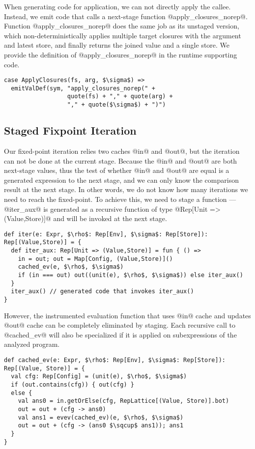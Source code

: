 When generating code for application, we can not directly apply the callee.
Instead, we emit code that calls a next-stage function @apply_closures_norep@.
Function @apply_closures_norep@ does the same job as its unstaged version,
which non-deterministically applies multiple target closures with the argument
and latest store, and finally returns the joined value and a single store.
We provide the definition of @apply_closures_norep@ in the runtime supporting code.

\begin{lstlisting}
case ApplyClosures(fs, arg, $\sigma$) =>
  emitValDef(sym, "apply_closures_norep(" + 
                  quote(fs) + "," + quote(arg) + 
                  "," + quote($\sigma$) + ")")
\end{lstlisting}

\subsection{Staged Fixpoint Iteration} 

Our fixed-point iteration relies two caches @in@ and @out@, but the iteration 
can not be done at the current stage.
Because the @in@ and @out@ are both next-stage values, thus the test of whether 
@in@ and @out@ are equal is a generated expression to the next stage, and we can only 
know the comparison result at the next stage. 
In other words, we do not know how many iterations we need to reach the fixed-point.
To achieve this, we need to stage a
function --- @iter_aux@ is generated as a recursive function of type @Rep[Unit => (Value,Store)]@
and will be invoked at the next stage.

\begin{lstlisting}
def iter(e: Expr, $\rho$: Rep[Env], $\sigma$: Rep[Store]): 
Rep[(Value,Store)] = {
  def iter_aux: Rep[Unit => (Value,Store)] = fun { () =>
    in = out; out = Map[Config, (Value,Store)]()
    cached_ev(e, $\rho$, $\sigma$)
    if (in === out) out((unit(e), $\rho$, $\sigma$)) else iter_aux()
  }
  iter_aux() // generated code that invokes iter_aux()
}
\end{lstlisting}

However, the instrumented evaluation function that uses @in@ cache and updates @out@ cache
can be completely eliminated by staging. Each recursive call to @cached_ev@ will also be specialized
if it is applied on subexpressions of the analyzed program.

\begin{lstlisting}
def cached_ev(e: Expr, $\rho$: Rep[Env], $\sigma$: Rep[Store]): 
Rep[(Value, Store)] = {
  val cfg: Rep[Config] = (unit(e), $\rho$, $\sigma$)
  if (out.contains(cfg)) { out(cfg) }
  else {
    val ans0 = in.getOrElse(cfg, RepLattice[(Value, Store)].bot)
    out = out + (cfg -> ans0)
    val ans1 = evev(cached_ev)(e, $\rho$, $\sigma$)
    out = out + (cfg -> (ans0 $\sqcup$ ans1)); ans1
  }
}
\end{lstlisting}

